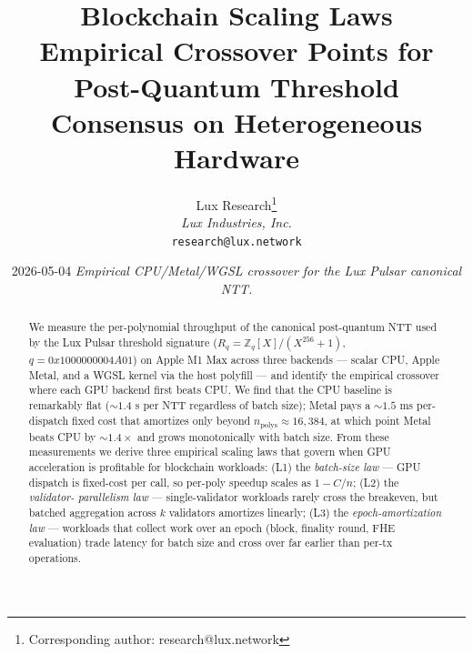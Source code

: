 \documentclass[11pt,a4paper]{article}
\title{Blockchain Scaling Laws \\
\large{Empirical Crossover Points for Post-Quantum Threshold Consensus on Heterogeneous Hardware}}
\author{
Lux Research\thanks{Corresponding author: research@lux.network}\\
\textit{Lux Industries, Inc.}\\
\texttt{research@lux.network}
}
\date{2026-05-04 \quad\textit{Empirical CPU/Metal/WGSL crossover for the Lux Pulsar canonical NTT.}}
\begin{document}
\luxcoverpage

\begin{abstract}
\noindent We measure the per-polynomial throughput of the canonical
post-quantum NTT used by the Lux Pulsar threshold signature
($R_q = \mathbb{Z}_q[X]/(X^{256}+1)$, $q = 0x1000000004A01$) on Apple
M1 Max across three backends — scalar CPU, Apple Metal, and a WGSL
kernel via the host polyfill — and identify the empirical crossover
where each GPU backend first beats CPU. We find that the CPU baseline
is remarkably flat ($\sim 1.4$ \textmu s per NTT regardless of batch
size); Metal pays a $\sim 1.5$ ms per-dispatch fixed cost that
amortizes only beyond $n_\text{polys} \approx 16{,}384$, at which point
Metal beats CPU by $\sim 1.4\times$ and grows monotonically with batch
size. From these measurements we derive three empirical scaling laws
that govern when GPU acceleration is profitable for blockchain workloads:
(L1) the \emph{batch-size law} — GPU dispatch is fixed-cost per call,
so per-poly speedup scales as $1 - C/n$; (L2) the \emph{validator-
parallelism law} — single-validator workloads rarely cross the
breakeven, but batched aggregation across $k$ validators amortizes
linearly; (L3) the \emph{epoch-amortization law} — workloads that
collect work over an epoch (block, finality round, FHE evaluation)
trade latency for batch size and cross over far earlier than per-tx
operations.
\end{abstract}

\tableofcontents
\newpage








\end{document}
